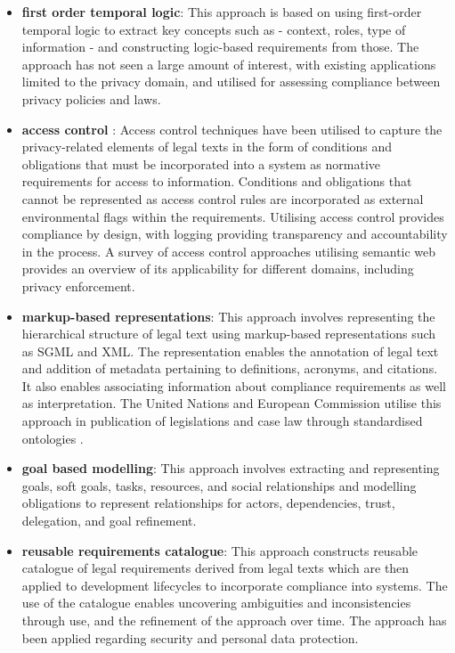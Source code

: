 \begin{itemize}
	\item \textbf{first order temporal logic}: This approach is based on using first-order temporal logic to extract key concepts such as - context, roles, type of information - and constructing logic-based requirements from those. The approach has not seen a large amount of interest, with existing applications limited to the privacy domain, and utilised for assessing compliance between privacy policies and laws.
	\item \textbf{access control }: Access control techniques have been utilised to capture the privacy-related elements of legal texts in the form of conditions and obligations that must be incorporated into a system as normative requirements for access to information. Conditions and obligations that cannot be represented as access control rules are incorporated as external environmental flags within the requirements. Utilising access control provides compliance by design, with logging providing transparency and accountability in the process. A survey of access control approaches utilising semantic web \cite{kirrane_access_2016} provides an overview of its applicability for different domains, including privacy enforcement.
	\item \textbf{markup-based representations}: This approach involves representing the hierarchical structure of legal text using markup-based representations such as SGML and XML. The representation enables the annotation of legal text and addition of metadata pertaining to definitions, acronyms, and citations. It also enables associating information about compliance requirements as well as interpretation. The United Nations and European Commission utilise this approach in publication of legislations and case law through standardised ontologies  \cite{palmirani_akoma_2018,european_union_eli_2015,van_opijnen_european_2011}.
	\item \textbf{goal based modelling}: This approach involves extracting and representing goals, soft goals, tasks, resources, and social relationships and modelling obligations to represent relationships for actors, dependencies, trust, delegation, and goal refinement. 
	\item \textbf{reusable requirements catalogue}: This approach constructs reusable catalogue of legal requirements derived from legal texts which are then applied to development lifecycles to incorporate compliance into systems. The use of the catalogue enables uncovering ambiguities and inconsistencies through use, and the refinement of the approach over time. The approach has been applied regarding security and personal data protection.
\end{itemize}

